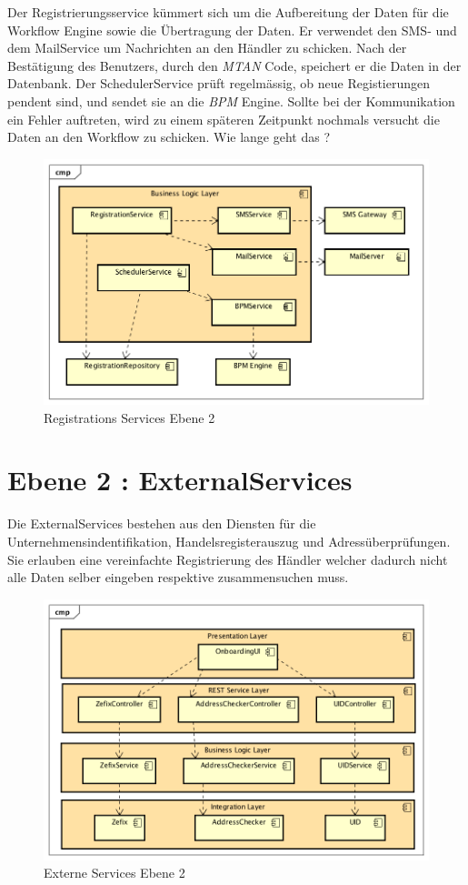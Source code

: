 Der Registrierungsservice kümmert sich um die Aufbereitung der Daten für die Workflow Engine sowie die Übertragung der Daten. Er verwendet den SMS- und dem MailService um Nachrichten an den Händler zu schicken. Nach der Bestätigung des Benutzers, durch den \textit{\gls{MTAN}} Code, speichert er die Daten in der Datenbank. Der SchedulerService prüft regelmässig, ob neue Registierungen pendent sind, und sendet sie an die \textit{\gls{BPM}} Engine. Sollte bei der Kommunikation ein Fehler auftreten, wird zu einem späteren Zeitpunkt nochmals versucht die Daten an den Workflow zu schicken. {\color{red} Wie lange geht das ?}
\begin{figure}[H]
	\centering
	\includegraphics[scale=0.65]{RegistrationServicesLevel2.png}
	\caption{Registrations Services Ebene 2}
\end{figure}
\newpage
\section{Ebene 2 : ExternalServices}

Die ExternalServices bestehen aus den Diensten für die Unternehmensindentifikation, Handelsregisterauszug und Adressüberprüfungen. Sie erlauben eine vereinfachte Registrierung des Händler welcher dadurch nicht alle Daten selber eingeben respektive zusammensuchen muss.

\begin{figure}[H]
	\centering
	\includegraphics[scale=0.65]{ExternalServicesLevel2.png}
	\caption{Externe Services Ebene 2}
\end{figure}